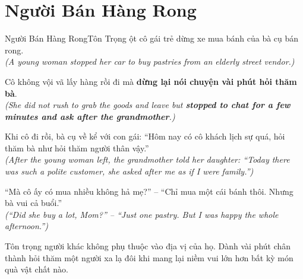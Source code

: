 \section{Người Bán Hàng Rong}
\begin{truyen}{Người Bán Hàng Rong}{Tôn Trọng}
ột cô gái trẻ dừng xe mua bánh của bà cụ bán rong.\\
\textit{(A young woman stopped her car to buy pastries from an elderly street vendor.)}

Cô không vội vã lấy hàng rồi đi mà \textbf{dừng lại nói chuyện vài phút hỏi thăm bà}.\\
\textit{(She did not rush to grab the goods and leave but \textbf{stopped to chat for a few minutes and ask after the grandmother}.)}

Khi cô đi rồi, bà cụ về kể với con gái: ``Hôm nay có cô khách lịch sự quá, hỏi thăm bà như hỏi thăm người thân vậy.''\\
\textit{(After the young woman left, the grandmother told her daughter: ``Today there was such a polite customer, she asked after me as if I were family.'')}

``Mà cô ấy có mua nhiều không hả mẹ?'' – ``Chỉ mua một cái bánh thôi. Nhưng bà vui cả buổi.''\\
\textit{(``Did she buy a lot, Mom?'' – ``Just one pastry. But I was happy the whole afternoon.'')}
\end{truyen}
\begin{baihoc}
  Tôn trọng người khác không phụ thuộc vào địa vị của họ. Dành vài phút chân thành hỏi thăm một người xa lạ đôi khi mang lại niềm vui lớn hơn bất kỳ món quà vật chất nào.
\end{baihoc}

